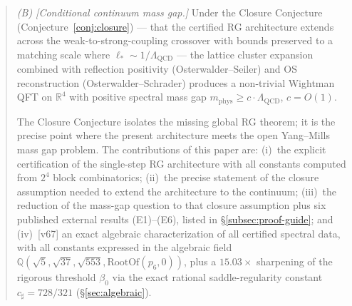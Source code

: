 \documentclass[11pt]{article}
\theoremstyle{definition}
\newcommand{\R}{\mathbb{R}}
\newcommand{\Lam}{\Lambda_{\mathrm{QCD}}}
\newcommand{\Q}{\mathbb{Q}}
\begin{document}
\begin{abstract}
\smallskip\noindent
\emph{(B) [Conditional continuum mass gap.]}
Under the Closure Conjecture (Conjecture~\ref{conj:closure}) ---
that the certified RG architecture extends across the
weak-to-strong-coupling crossover with bounds preserved to a
matching scale where $\ell_*\sim 1/\Lam$ --- the lattice cluster
expansion combined with reflection positivity (Osterwalder--Seiler)
and OS reconstruction (Osterwalder--Schrader) produces a
non-trivial Wightman QFT on $\R^4$ with positive spectral mass
gap $m_{\mathrm{phys}}\ge c\cdot\Lam$, $c=O(1)$.

\smallskip\noindent
The Closure Conjecture isolates the missing global RG theorem;
it is the precise point where the present architecture meets the
open Yang--Mills mass gap problem.  The contributions of this
paper are: (i)~the explicit certification of the single-step RG
architecture with all constants computed from $2^4$ block
combinatorics; (ii)~the precise statement of the closure
assumption needed to extend the architecture to the continuum;
(iii)~the reduction of the mass-gap question to that closure
assumption plus six published external results (E1)--(E6),
listed in \S\ref{subsec:proof-guide}; and (iv)~[v67] an exact
algebraic characterization of all certified spectral data, with
all constants expressed in the algebraic field
$\Q(\sqrt 5,\sqrt{37},\sqrt{553},\mathrm{RootOf}(p_6,0))$, plus
a $15.03\times$ sharpening of the rigorous threshold $\beta_0$
via the exact rational saddle-regularity constant $c_\sharp=728/321$
(\S\ref{sec:algebraic}).

\end{abstract}
\end{document}
